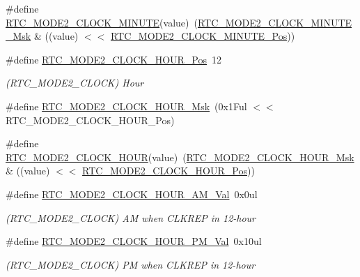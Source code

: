 \begin{DoxyCompactItemize}
\#define \mbox{\hyperlink{group___s_a_m_d21___r_t_c_ga852f4332930aecd5b658260e76f7bbf9}{R\+T\+C\+\_\+\+M\+O\+D\+E2\+\_\+\+C\+L\+O\+C\+K\+\_\+\+M\+I\+N\+U\+TE}}(value)~(\mbox{\hyperlink{group___s_a_m_d21___r_t_c_ga392a7abb4aaf2008699481461e3295a9}{R\+T\+C\+\_\+\+M\+O\+D\+E2\+\_\+\+C\+L\+O\+C\+K\+\_\+\+M\+I\+N\+U\+T\+E\+\_\+\+Msk}} \& ((value) $<$$<$ \mbox{\hyperlink{group___s_a_m_d21___r_t_c_ga6833c1b1a7d09a2acde357c93ffaa723}{R\+T\+C\+\_\+\+M\+O\+D\+E2\+\_\+\+C\+L\+O\+C\+K\+\_\+\+M\+I\+N\+U\+T\+E\+\_\+\+Pos}}))
\item 
\#define \mbox{\hyperlink{group___s_a_m_d21___r_t_c_ga9d3b894886a7457a79dea73e59447dfb}{R\+T\+C\+\_\+\+M\+O\+D\+E2\+\_\+\+C\+L\+O\+C\+K\+\_\+\+H\+O\+U\+R\+\_\+\+Pos}}~12
\begin{DoxyCompactList}\small\item\em (R\+T\+C\+\_\+\+M\+O\+D\+E2\+\_\+\+C\+L\+O\+CK) Hour \end{DoxyCompactList}\item 
\#define \mbox{\hyperlink{group___s_a_m_d21___r_t_c_ga805c8903fb32bb70279c4ba72478a2da}{R\+T\+C\+\_\+\+M\+O\+D\+E2\+\_\+\+C\+L\+O\+C\+K\+\_\+\+H\+O\+U\+R\+\_\+\+Msk}}~(0x1\+Ful $<$$<$ R\+T\+C\+\_\+\+M\+O\+D\+E2\+\_\+\+C\+L\+O\+C\+K\+\_\+\+H\+O\+U\+R\+\_\+\+Pos)
\item 
\#define \mbox{\hyperlink{group___s_a_m_d21___r_t_c_ga5778ea1a6ebd061005fb49ac68ab3d23}{R\+T\+C\+\_\+\+M\+O\+D\+E2\+\_\+\+C\+L\+O\+C\+K\+\_\+\+H\+O\+UR}}(value)~(\mbox{\hyperlink{group___s_a_m_d21___r_t_c_ga805c8903fb32bb70279c4ba72478a2da}{R\+T\+C\+\_\+\+M\+O\+D\+E2\+\_\+\+C\+L\+O\+C\+K\+\_\+\+H\+O\+U\+R\+\_\+\+Msk}} \& ((value) $<$$<$ \mbox{\hyperlink{group___s_a_m_d21___r_t_c_ga9d3b894886a7457a79dea73e59447dfb}{R\+T\+C\+\_\+\+M\+O\+D\+E2\+\_\+\+C\+L\+O\+C\+K\+\_\+\+H\+O\+U\+R\+\_\+\+Pos}}))
\item 
\#define \mbox{\hyperlink{group___s_a_m_d21___r_t_c_ga2394b9b5bd5cf225513925eb1ecc7695}{R\+T\+C\+\_\+\+M\+O\+D\+E2\+\_\+\+C\+L\+O\+C\+K\+\_\+\+H\+O\+U\+R\+\_\+\+A\+M\+\_\+\+Val}}~0x0ul
\begin{DoxyCompactList}\small\item\em (R\+T\+C\+\_\+\+M\+O\+D\+E2\+\_\+\+C\+L\+O\+CK) AM when C\+L\+K\+R\+EP in 12-\/hour \end{DoxyCompactList}\item 
\#define \mbox{\hyperlink{group___s_a_m_d21___r_t_c_gaa4eaa47a159b2c7eb84db6ef2978a7a0}{R\+T\+C\+\_\+\+M\+O\+D\+E2\+\_\+\+C\+L\+O\+C\+K\+\_\+\+H\+O\+U\+R\+\_\+\+P\+M\+\_\+\+Val}}~0x10ul
\begin{DoxyCompactList}\small\item\em (R\+T\+C\+\_\+\+M\+O\+D\+E2\+\_\+\+C\+L\+O\+CK) PM when C\+L\+K\+R\+EP in 12-\/hour \end{DoxyCompactList}\item 
$$
\end{DoxyCompactItemize}
